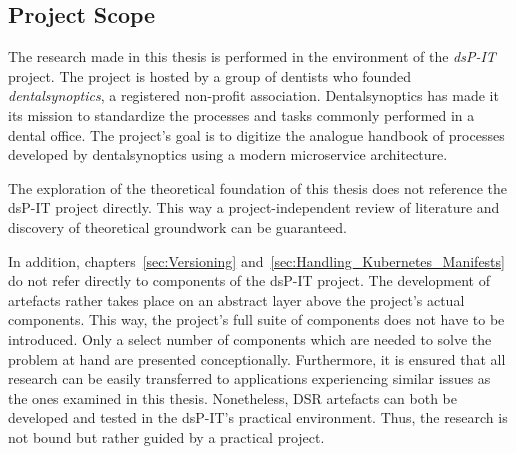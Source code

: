 
\subsection{Project Scope}%
\label{sub:Project_Scope}

The research made in this thesis is performed in the environment of the
\textit{dsP-IT} project. The project is hosted by a group of dentists who
founded \textit{dentalsynoptics}, a registered non-profit association.
Dentalsynoptics has made it its mission to standardize the processes and tasks
commonly performed in a dental office. The project's goal is to digitize the
analogue handbook of processes developed by dentalsynoptics using a modern
microservice \autocite{HomepageDentalSynoptics2018} architecture.

The exploration of the theoretical foundation of this thesis does not reference
the dsP-IT project directly. This way a project-independent review of literature
and discovery of theoretical groundwork can be guaranteed.

In addition, chapters~\ref{sec:Versioning}
and~\ref{sec:Handling_Kubernetes_Manifests} do not refer directly to components
of the dsP-IT project. The development of artefacts rather takes place on an
abstract layer above the project's actual components. This way, the project's
full suite of components does not have to be introduced. Only a select number
of components which are needed to solve the problem at hand are presented
conceptionally. Furthermore, it is ensured that all research can be easily
transferred to applications experiencing similar issues as the ones examined in
this thesis. Nonetheless, \ac{DSR} artefacts can both be developed and tested in
the dsP-IT's practical environment. Thus, the research is not bound but rather
guided by a practical project.
